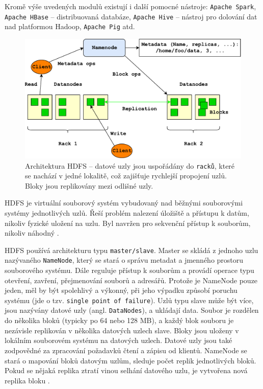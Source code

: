 \noindent Kromě výše uvedených modulů existují i další pomocné nástroje:  \texttt{Apache Spark}, \texttt{Apache HBase} -- distribuovaná databáze, \texttt{Apache Hive} -- nástroj pro dolování dat nad platformou Hadoop, \texttt{Apache Pig} atd.

\begin{figure}[!h]
  \centering
  \includegraphics[width=15cm]{template-fig/HDFSArchitecture.pdf}
  \caption{Architektura HDFS \cite{apacheHDFSGuide} -- datové uzly jsou uspořádány do \texttt{racků}, které se nachází v jedné lokalitě, což zajišťuje rychlejší propojení uzlů. Bloky jsou replikovány mezi odlišné uzly.}
  \label{FIG_HDFSArchitecture}
\end{figure}

\noindent HDFS je virtuální souborový systém vybudovaný nad běžnými souborovými systémy jednotlivých uzlů. Řeší problém nalezení úložiště a přístupu k datům, nikoliv fyzické uložení na uzlu. Byl navržen pro sekvenční přístup k souborům, nikoliv náhodný \cite{hadoopPdi}.

\noindent HDFS používá architekturu typu \texttt{master/slave}. Master se skládá z jednoho uzlu nazývaného \texttt{NameNode}, který se stará o správu metadat a jmenného prostoru souborového systému. Dále reguluje přístup k souborům a provádí operace typu otevření, zavření, přejmenování souborů a adresářů. Protože je NameNode pouze jeden, měl by být spolehlivý a výkonný, při jeho výpadku způsobí poruchu systému (jde o tzv. \texttt{single point of failure}). Uzlů typu slave může být více, jsou nazývány datové uzly (angl. \texttt{DataNodes}), a ukládají data. Soubor je rozdělen do několika bloků (typicky po 64 nebo 128 MB), a každý blok souboru je nezávisle replikován v několika datových uzlech slave. Bloky jsou uloženy v lokálním souborovém systému na datových uzlech. Datové uzly jsou také zodpovědné za zpracování požadavků čtení a zápisu od klientů. NameNode se stará o mapování bloků datovým uzlům, sleduje počet replik jednotlivých bloků. Pokud se nějaká replika ztratí vinou selhání datového uzlu, je vytvořena nová replika bloku \cite{hadoopHortonworks}.

